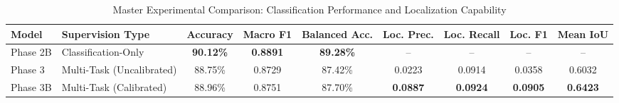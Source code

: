 \begin{table}[t]
\centering
\caption{Master Experimental Comparison: Classification Performance and Localization Capability}
\label{tab:main_model_comparison}
\small
\setlength{\tabcolsep}{8pt}
\begin{tabular}{llccccccc}
\toprule
\textbf{Model} & \textbf{Supervision Type} & \textbf{Accuracy} & \textbf{Macro F1} & \textbf{Balanced Acc.} & \textbf{Loc. Prec.} & \textbf{Loc. Recall} & \textbf{Loc. F1} & \textbf{Mean IoU} \\
\midrule
Phase 2B & Classification-Only & \textbf{90.12\%} & \textbf{0.8891} & \textbf{89.28\%} & -- & -- & -- & -- \\
Phase 3 & Multi-Task (Uncalibrated) & 88.75\% & 0.8729 & 87.42\% & 0.0223 & 0.0914 & 0.0358 & 0.6032 \\
Phase 3B & Multi-Task (Calibrated) & 88.96\% & 0.8751 & 87.70\% & \textbf{0.0887} & \textbf{0.0924} & \textbf{0.0905} & \textbf{0.6423} \\
\bottomrule
\end{tabular}
\end{table}

